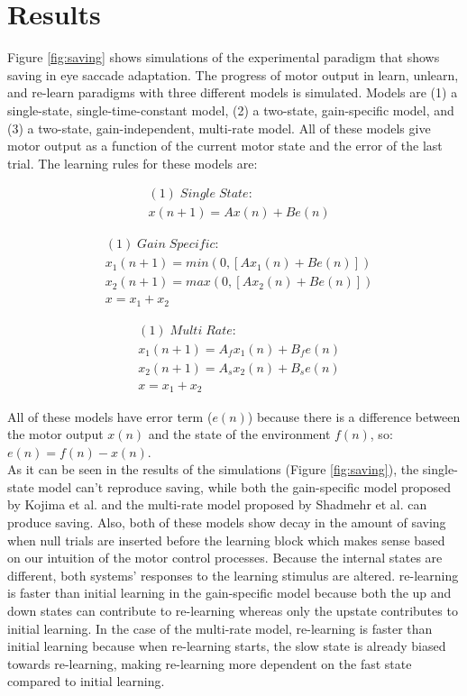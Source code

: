 \documentclass[9pt,twocolumn]{paper-template}
\begin{document}
\section*{Results}
Figure \ref{fig:saving} shows simulations of the experimental paradigm that shows saving in eye saccade adaptation. The progress of motor output in learn, unlearn, and re-learn paradigms with three different models is simulated. Models are (1) a single-state, single-time-constant model, (2) a two-state, gain-specific model, and (3) a two-state, gain-independent, multi-rate model. All of these models give motor output as a function of the current motor state and the error of the last trial. The learning rules for these models are:

\begin{eqnarray*}
& (1)\;Single\;State:\\
& x(n+1) = Ax(n)+Be(n)
\end{eqnarray*}

\begin{eqnarray*}
& (1)\;Gain\;Specific:\\
&x_1(n+1) = min(0,[Ax_1(n)+Be(n)])\\
&x_2(n+1) = max(0,[Ax_2(n)+Be(n)])\\
&x = x_1+x_2
\end{eqnarray*}


\begin{eqnarray*}
& (1)\;Multi\;Rate:\\
& x_1(n+1) = A_fx_1(n) + B_fe(n)\\
& x_2(n+1) = A_sx_2(n) + B_se(n)\\
&x = x_1+x_2
\end{eqnarray*}

All of these models have error term ($e(n)$) because there is a difference between the motor output $x(n)$ and the state of the environment $f(n)$, so: $e(n) = f (n) - x(n)$.\\
As it can be seen in the results of the simulations (Figure \ref{fig:saving}), the single-state model can't reproduce saving, while both the gain-specific model proposed by Kojima et al. and the multi-rate model proposed by Shadmehr et al. can produce saving. Also, both of these models show decay in the amount of saving when null trials are inserted before the learning block which makes sense based on our intuition of the motor control processes. Because the internal states are different, both systems’ responses to the learning stimulus are altered. re-learning is faster than initial learning in the gain-specific model because both the up and down states can contribute to re-learning whereas only the upstate contributes to initial learning. In the case of the multi-rate model, re-learning is faster than initial learning because when re-learning starts, the
slow state is already biased towards re-learning, making re-learning more dependent on the fast state compared to initial learning.\\
\end{document}
